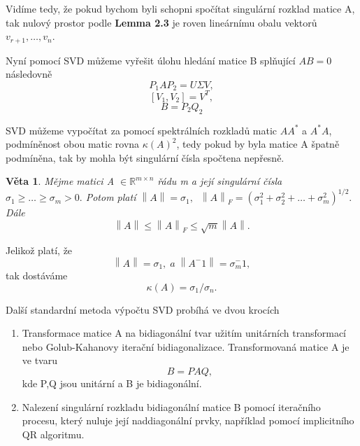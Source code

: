 \documentclass{article}
\theoremstyle{plain}
\newtheorem{veta}{Věta}[section]
\theoremstyle{definition}
\begin{document}
Vidíme tedy, že pokud bychom byli schopni spočítat singulární rozklad matice A, tak nulový prostor podle \textbf{Lemma 2.3} je roven lineárnímu obalu vektorů $v_{r+1},\hdots,v_n$.

Nyní pomocí SVD můžeme vyřešit úlohu hledání matice B splňující $AB=0$ následovně
$$P_1AP_2=U\Sigma V,$$
$$[V_1,V_2]=V^T,$$
$$B=P_2Q_2$$

\newpage

SVD můžeme vypočítat za pomocí spektrálních rozkladů matic $AA^*$ a $A^*A$, podmíněnost obou matic rovna $\kappa(A)^2$, tedy pokud by byla matice A špatně podmíněna, tak by mohla být singulární čísla spočtena nepřesně.

\begin{veta}
    Mějme matici A $\in \mathbb{R}^{m \times n}$ řádu m a její singulární čísla $\sigma_1\geq\hdots\geq\sigma_m>0.$
Potom platí $\left \lVert A \right \rVert = \sigma_1,\;\;
\left \lVert A \right \rVert _F = (\sigma_1^2+\sigma_2^2+\hdots+\sigma_m^2)^{1/2}.$
Dále
$$\left \lVert A \right \rVert \leq \left \lVert A \right \rVert _F \leq \sqrt{m} \left \lVert A \right \rVert.$$
\end{veta}
Jelikož platí, že $$\left \lVert A \right \rVert = \sigma_1,\;a\; \left \lVert A^-1 \right \rVert = \sigma_m^-1,$$
tak dostáváme
$$\kappa(A)=\sigma_1 / \sigma_n.$$

Další standardní metoda výpočtu SVD probíhá ve dvou krocích
\begin{enumerate}
    \item Transformace matice A na bidiagonální tvar užitím unitárních transformací nebo Golub-Kahanovy iterační bidiagonalizace. Transformovaná matice A je ve tvaru 
    $$B=PAQ,$$
    kde P,Q jsou unitární a B je bidiagonální.
    \item Nalezení singulární rozkladu bidiagonální matice B pomocí iteračního procesu, který nuluje její naddiagonální prvky, například pomocí implicitního QR algoritmu.
\end{enumerate}
\end{document}
